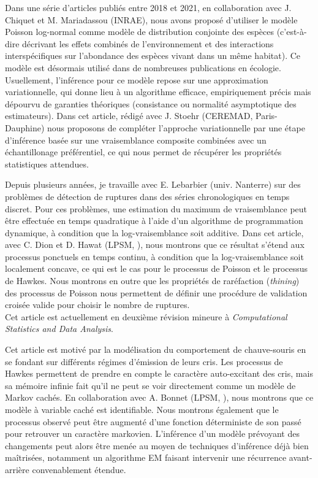 \begin{description}
  Dans une série d'articles publiés entre 2018 et 2021, en collaboration avec J. Chiquet et M. Mariadassou (INRAE), nous avons proposé d'utiliser le modèle Poisson log-normal comme modèle de distribution conjointe des espèces (c'est-à-dire décrivant les effets combinés de l'environnement et des interactions interspécifiques sur l'abondance des espèces vivant dans un même habitat). Ce modèle est désormais utilisé dans de nombreuses publications en écologie. Usuellement, l'inférence pour ce modèle repose sur une approximation variationnelle, qui donne lieu à un algorithme efficace, empiriquement précis mais dépourvu de garanties théoriques (consistance ou normalité asymptotique des estimateurs). Dans cet article, rédigé avec J. Stoehr (CEREMAD, Paris-Dauphine) nous proposons de compléter l'approche variationnelle par une étape d'inférence basée sur une vraisemblance composite combinées avec un échantillonage préférentiel, ce qui nous permet de récupérer les propriétés statistiques attendues.
  \item[\cite{DHL24} {\sl ArXiv, 2024}.] 
  Depuis plusieurs années, je travaille avec E. Lebarbier (univ. Nanterre) sur des problèmes de détection de ruptures dans des séries chronologiques en temps discret. 
  Pour ces problèmes, une estimation du maximum de vraisemblance peut être effectuée en temps quadratique à l'aide d'un algorithme de programmation dynamique, à condition que la log-vraisemblance soit additive.
  Dans cet article, avec C. Dion et D. Hawat (LPSM, \SU), nous montrons que ce résultat s'étend aux processus ponctuels en temps continu, à condition que la log-vraisemblance soit localement concave, ce qui est le cas pour le processus de Poisson et le processus de Hawkes.
  Nous montrons en outre que les propriétés de raréfaction ({\sl thining}) des processus de Poisson nous permettent de définir une procédure de validation croisée valide pour choisir le nombre de ruptures. \\
  Cet article est actuellement en deuxième révision mineure à {\sl Computational Statistics and Data Analysis}.
  \item[\cite{BoR25} {\sl ArXiv, 2025}.] 
  Cet article est motivé par la modélisation du comportement de chauve-souris en se fondant sur différents régimes d’émission de leurs cris. 
  Les processus de Hawkes permettent de prendre en compte le caractère auto-excitant des cris, mais sa mémoire infinie fait qu'il ne peut se voir directement comme un modèle de Markov cachés. 
  En collaboration avec A. Bonnet (LPSM, \SU), nous montrons que ce modèle à variable caché est identifiable. 
  Nous montrons également que le processus observé peut être augmenté d’une fonction déterministe de son passé pour retrouver un caractère markovien. 
  L’inférence d’un modèle prévoyant des changements peut alors être menée au moyen de techniques d'inférence déjà bien maîtrisées, notamment un algorithme EM faisant intervenir une récurrence avant-arrière convenablement étendue.
\end{description}

